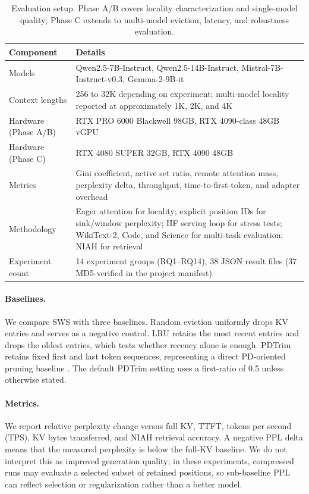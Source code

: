 \documentclass[11pt]{article}
\newcommand{\method}{SWS}
\theoremstyle{definition}
\theoremstyle{plain}
\begin{document}
\begin{table}[t]
\centering
\caption{Evaluation setup.  Phase A/B covers locality characterization and single-model quality; Phase C extends to multi-model eviction, latency, and robustness evaluation.}
\label{tab:setup}
\small
\begin{tabularx}{\linewidth}{lY}
\toprule
Component & Details \\
\midrule
Models & Qwen2.5-7B-Instruct, Qwen2.5-14B-Instruct, Mistral-7B-Instruct-v0.3, Gemma-2-9B-it \\
Context lengths & 256 to 32K depending on experiment; multi-model locality reported at approximately 1K, 2K, and 4K \\
Hardware (Phase A/B) & RTX PRO 6000 Blackwell 98GB, RTX 4090-class 48GB vGPU \\
Hardware (Phase C) & RTX 4080 SUPER 32GB, RTX 4090 48GB \\
Metrics & Gini coefficient, active set ratio, remote attention mass, perplexity delta, throughput, time-to-first-token, and adapter overhead \\
Methodology & Eager attention for locality; explicit position IDs for sink/window perplexity; HF serving loop for stress tests; WikiText-2, Code, and Science for multi-task evaluation; NIAH for retrieval \\
Experiment count & 14 experiment groups (RQ1--RQ14), 38 JSON result files (37 MD5-verified in the project manifest) \\
\bottomrule
\end{tabularx}
\end{table}

\paragraph{Baselines.}
We compare \method{} with three baselines.  Random eviction uniformly drops KV entries and serves as a negative control.  LRU retains the most recent entries and drops the oldest entries, which tests whether recency alone is enough.  PDTrim retains fixed first and last token sequences, representing a direct PD-oriented pruning baseline \citep{pdtrim}.  The default PDTrim setting uses a first-ratio of 0.5 unless otherwise stated.

\paragraph{Metrics.}
We report relative perplexity change versus full KV, TTFT, tokens per second (TPS), KV bytes transferred, and NIAH retrieval accuracy.  A negative PPL delta means that the measured perplexity is below the full-KV baseline.  We do not interpret this as improved generation quality; in these experiments, compressed runs may evaluate a selected subset of retained positions, so sub-baseline PPL can reflect selection or regularization rather than a better model.
\end{document}
